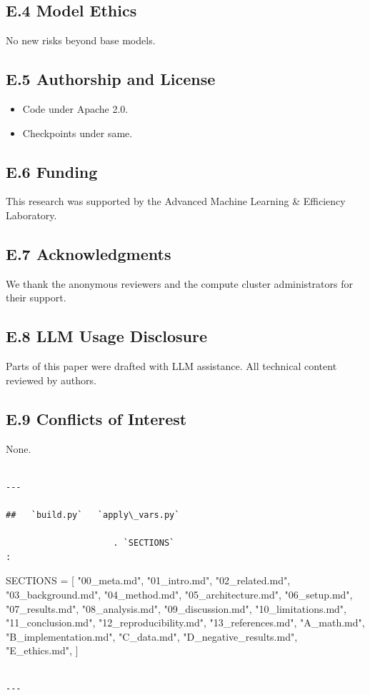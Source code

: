 \subsection{E.4 Model Ethics}

No new risks beyond base models.

\subsection{E.5 Authorship and License}

\begin{itemize}
\item Code under Apache 2.0.
\item Checkpoints under same.

\end{itemize}
\subsection{E.6 Funding}

This research was supported by the Advanced Machine Learning \& Efficiency Laboratory.

\subsection{E.7 Acknowledgments}

We thank the anonymous reviewers and the compute cluster administrators for their support.

\subsection{E.8 LLM Usage Disclosure}

Parts of this paper were drafted with LLM assistance. All technical content 
reviewed by authors.

\subsection{E.9 Conflicts of Interest}

None.
\begin{lstlisting}

---

##   `build.py`   `apply\_vars.py`

                     . `SECTIONS`                                     :

\end{lstlisting}
SECTIONS = [
    "00\_meta.md", "01\_intro.md", "02\_related.md", "03\_background.md",
    "04\_method.md", "05\_architecture.md", "06\_setup.md", "07\_results.md",
    "08\_analysis.md", "09\_discussion.md", "10\_limitations.md",
    "11\_conclusion.md", "12\_reproducibility.md", "13\_references.md",
    "A\_math.md", "B\_implementation.md", "C\_data.md",
    "D\_negative\_results.md", "E\_ethics.md",
]
\begin{lstlisting}

---
\end{lstlisting}